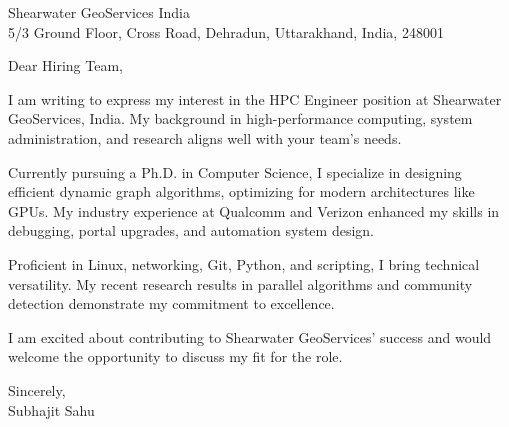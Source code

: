 \documentclass[a4paper,12pt]{letter}
\begin{document}
\begin{letter}{Shearwater GeoServices India \\ 5/3 Ground Floor, Cross Road, Dehradun, Uttarakhand, India, 248001}

\fontsize{12}{14}\selectfont

\opening{Dear Hiring Team,}

I am writing to express my interest in the HPC Engineer position at Shearwater GeoServices, India. My background in high-performance computing, system administration, and research aligns well with your team's needs.

Currently pursuing a Ph.D. in Computer Science, I specialize in designing efficient dynamic graph algorithms, optimizing for modern architectures like GPUs. My industry experience at Qualcomm and Verizon enhanced my skills in debugging, portal upgrades, and automation system design.

Proficient in Linux, networking, Git, Python, and scripting, I bring technical versatility. My recent research results in parallel algorithms and community detection demonstrate my commitment to excellence.

I am excited about contributing to Shearwater GeoServices' success and would welcome the opportunity to discuss my fit for the role.

\closing{Sincerely, \\ Subhajit Sahu}

\end{letter}
\end{document}
